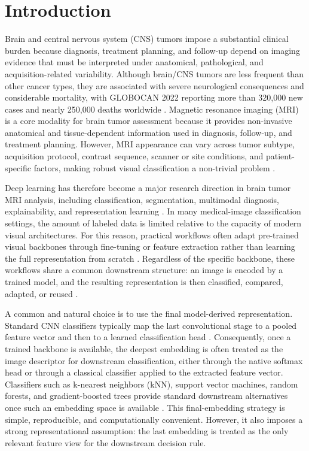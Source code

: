 \documentclass[main.tex]{subfiles}
\begin{document}
\section{Introduction}
\label{sec:introduction}



Brain and central nervous system (CNS) tumors impose a substantial clinical burden because diagnosis, treatment planning, and follow-up depend on imaging evidence that must be interpreted under anatomical, pathological, and acquisition-related variability. Although brain/CNS tumors are less frequent than other cancer types, they are associated with severe neurological consequences and considerable mortality, with GLOBOCAN 2022 reporting more than 320,000 new cases and nearly 250,000 deaths worldwide \cite{globocan2022braincns,globocan2022chile}. Magnetic resonance imaging (MRI) is a core modality for brain tumor assessment because it provides non-invasive anatomical and tissue-dependent information used in diagnosis, follow-up, and treatment planning. However, MRI appearance can vary across tumor subtype, acquisition protocol, contrast sequence, scanner or site conditions, and patient-specific factors, making robust visual classification a non-trivial problem \cite{dorfner2025review,harmonizationMRI}.

Deep learning has therefore become a major research direction in brain tumor MRI analysis, including classification, segmentation, multimodal diagnosis, explainability, and representation learning \cite{dorfner2025review,ketabi2025multimodal,xaiMedical}. In many medical-image classification settings, the amount of labeled data is limited relative to the capacity of modern visual architectures. For this reason, practical workflows often adapt pre-trained visual backbones through fine-tuning or feature extraction rather than learning the full representation from scratch \cite{yosinski2014transferable,bar2024frofa}. Regardless of the specific backbone, these workflows share a common downstream structure: an image is encoded by a trained model, and the resulting representation is then classified, compared, adapted, or reused \cite{bar2024frofa,li2025embeddings}.


A common and natural choice is to use the final model-derived representation. Standard CNN classifiers typically map the last convolutional stage to a pooled feature vector and then to a learned classification head \cite{he2016resnet,huang2017densenet,tan2019efficientnet}. Consequently, once a trained backbone is available, the deepest embedding is often treated as the image descriptor for downstream classification, either through the native softmax head or through a classical classifier applied to the extracted feature vector. Classifiers such as k-nearest neighbors (kNN), support vector machines, random forests, and gradient-boosted trees provide standard downstream alternatives once such an embedding space is available \cite{cover1967nearest,cortes1995svm,breiman2001random,chen2016xgboost}. This final-embedding strategy is simple, reproducible, and computationally convenient. However, it also imposes a strong representational assumption: the last embedding is treated as the only relevant feature view for the downstream decision rule.
\end{document}
